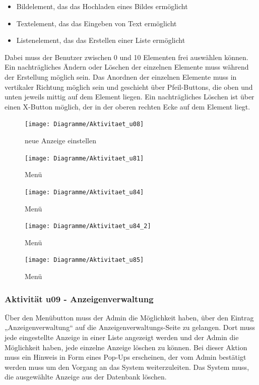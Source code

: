 \documentclass[a4paper,12pt,oneside]{scrartcl}
\begin{document}
\begin{itemize}
	\item Bildelement, das das Hochladen eines Bildes ermöglicht
	\item Textelement, das das Eingeben von Text ermöglicht
	\item Listenelement, das das Erstellen einer Liste ermöglicht
\end{itemize}
Dabei muss der Benutzer zwischen 0 und 10 Elementen frei auswählen können.
Ein nachträgliches Ändern oder Löschen der einzelnen Elemente muss während der Erstellung möglich sein.
Das Anordnen der einzelnen Elemente muss in vertikaler Richtung möglich sein und geschieht über Pfeil-Buttons, die oben und unten jeweils mittig auf dem Element liegen.
Ein nachträgliches Löschen ist über einen X-Button möglich, der in der oberen rechten Ecke auf dem Element liegt.

\begin{figure}[!htbp]
\centering
\noindent\texttt{[image: Diagramme/Aktivitaet\_u08]}
\caption{neue Anzeige einstellen}
\end{figure}
\FloatBarrier

\begin{figure}[!htbp]
\centering
\noindent\texttt{[image: Diagramme/Aktivitaet\_u81]}
\caption{Menü}
\end{figure}
\FloatBarrier

\begin{figure}[!htbp]
\centering
\noindent\texttt{[image: Diagramme/Aktivitaet\_u84]}
\caption{Menü}
\end{figure}
\FloatBarrier

\begin{figure}[!htbp]
\centering
\noindent\texttt{[image: Diagramme/Aktivitaet\_u84\_2]}
\caption{Menü}
\end{figure}
\FloatBarrier

\begin{figure}[!htbp]
\centering
\noindent\texttt{[image: Diagramme/Aktivitaet\_u85]}
\caption{Menü}
\end{figure}
\FloatBarrier

\subsubsection{Aktivität u09 - Anzeigenverwaltung}
Über den Menübutton muss der Admin die Möglichkeit haben, über den Eintrag „Anzeigenverwaltung“ auf die Anzeigenverwaltungs-Seite zu gelangen. 
Dort muss jede eingestellte Anzeige in einer Liste angezeigt werden und der Admin die Möglichkeit haben, jede einzelne Anzeige löschen zu können. 
Bei dieser Aktion muss ein Hinweis in Form eines Pop-Ups erscheinen, der vom Admin bestätigt werden muss um den Vorgang an das System weiterzuleiten. 
Das System muss, die ausgewählte Anzeige aus der Datenbank löschen.
\end{document}
